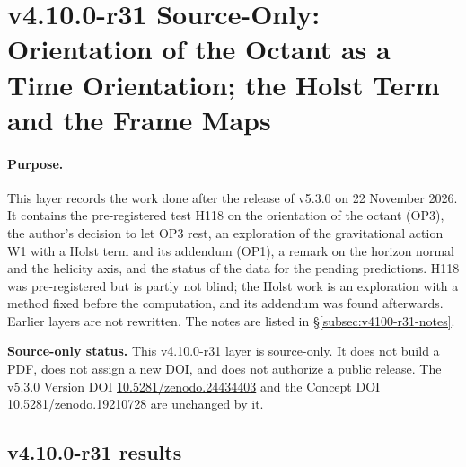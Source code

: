 \clearpage
\section*{v4.10.0-r31 Source-Only: Orientation of the Octant as a Time Orientation; the Holst Term and the Frame Maps}
\label{sec:v4100-r31-orientation-holst}

\paragraph{Purpose.}
This layer records the work done after the release of v5.3.0 on 22 November 2026.  It contains the pre-registered test H118 on the
orientation of the octant (OP3), the author's decision to let OP3 rest, an exploration of the gravitational action W1 with a Holst
term and its addendum (OP1), a remark on the horizon normal and the helicity axis, and the status of the data for the pending
predictions.  H118 was pre-registered but is partly not blind; the Holst work is an exploration with a method fixed before the
computation, and its addendum was found afterwards.  Earlier layers are not rewritten.  The notes are listed in
\S\ref{subsec:v4100-r31-notes}.

\noindent\textbf{Source-only status.}
This v4.10.0-r31 layer is source-only.  It does not build a PDF, does not assign a new DOI,
and does not authorize a public release.  The v5.3.0 Version DOI
\href{https://doi.org/10.5281/zenodo.24434403}{10.5281/zenodo.24434403} and the Concept DOI
\href{https://doi.org/10.5281/zenodo.19210728}{10.5281/zenodo.19210728} are unchanged by it.

\subsection*{v4.10.0-r31 results}
\label{subsec:v4100-r31-results}

